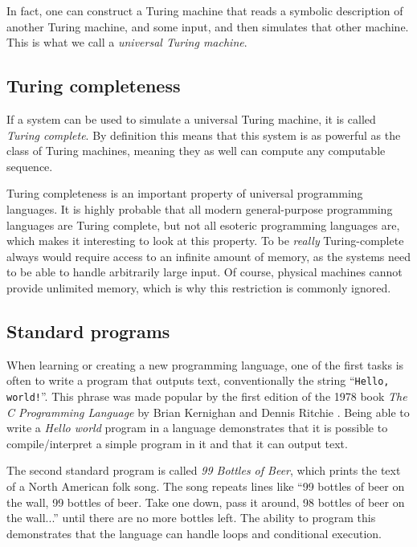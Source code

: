 \documentclass{sig-alternate}
\begin{document}
In fact, one can construct a Turing machine that reads a symbolic description of another Turing machine, and some input, and then simulates that other machine. This is what we call a \emph{universal Turing machine}.

\subsection{Turing completeness}

If a system can be used to simulate a universal Turing machine, it is called \emph{Turing complete}. By definition this means that this system is as powerful as the class of Turing machines, meaning they as well can compute any computable sequence.

Turing completeness is an important property of universal programming languages. It is highly probable that all modern general-purpose programming languages are Turing complete, but not all esoteric programming languages are, which makes it interesting to look at this property. To be \emph{really} Turing-complete always would require access to an infinite amount of memory, as the systems need to be able to handle arbitrarily large input. Of course, physical machines cannot provide unlimited memory, which is why this restriction is commonly ignored.

\subsection{Standard programs}

When learning or creating a new programming language, one of the first tasks is often to write a program that outputs text, conventionally the string “\texttt{Hello, world!}”. This phrase was made popular by the first edition of the 1978 book \emph{The C Programming Language} by Brian Kernighan and Dennis Ritchie \cite{kernighan1978c}. Being able to write a \emph{Hello world} program in a language demonstrates that it is possible to compile/interpret a simple program in it and that it can output text.

The second standard program is called \emph{99 Bottles of Beer}, which prints the text of a North American folk song. The song repeats lines like “99 bottles of beer on the wall, 99 bottles of beer. Take one down, pass it around, 98 bottles of beer on the wall...” until there are no more bottles left. The ability to program this demonstrates that the language can handle loops and conditional execution.
\end{document}
